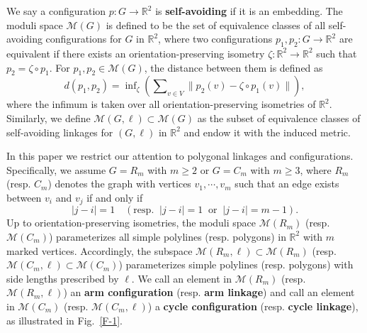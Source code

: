 \documentclass[11pt,letterpaper]{amsart}
\theoremstyle{plain}
\theoremstyle{definition}
\theoremstyle{remark}
\numberwithin{equation}{section}
\begin{document}
We say a configuration $p: G\to \mathbb R^{2}$ is \textbf{self-avoiding} if it is an embedding. The moduli space $\mathcal M(G)$ is defined to be the set of equivalence classes of all self-avoiding configurations for $G$ in $\mathbb R^2$, where two configurations $p_1,p_2: G\to \mathbb R^{2}$ are equivalent if there exists an orientation-preserving isometry
$\zeta:\mathbb R^{2}\to \mathbb R^{2}$ such that $p_2=\zeta\circ p_1$.  For $p_1,p_2\in\mathcal M(G)$, the distance between them is defined as
\[
d(p_1,p_2)=\inf\nolimits_{\zeta}\left(\sum\nolimits_{v\in V}\|p_2(v)-\zeta\circ p_1(v)\|\right),
\]
where the  infimum is taken over all orientation-preserving isometries of $\mathbb R^2$. Similarly, we define $\mathcal M(G,\ell)\subset \mathcal M(G)$ as the subset of equivalence classes of self-avoiding linkages for $(G,\ell)$ in $\mathbb R^2$ and endow it with the induced metric.

In this paper we restrict our attention to polygonal linkages and configurations. Specifically, we assume $G=R_m$ with $m\geq2$ or $G=C_m$ with $m\geq3$, where $R_m$ (resp. $C_m$) denotes the graph with vertices $v_1,\cdots, v_m$ such that an edge exists between $v_i$ and $v_j$ if and only if
\[
|j-i|=1\quad \left(\text{resp}.\;\;|j-i|=1\;\;\text{or}\;\;|j-i|=m-1\right).
\]
Up to orientation-preserving isometries, the moduli space $\mathcal M(R_m)$
(resp. $\mathcal M(C_m)$) parameterizes all simple polylines (resp. polygons) in
$\mathbb R^2$ with $m$ marked vertices. Accordingly, the subspace
$\mathcal M(R_m,\ell)\subset \mathcal M(R_m)$
(resp. $\mathcal M(C_m,\ell)\subset \mathcal M(C_m)$) parameterizes simple polylines (resp. polygons) with side lengths prescribed by $\ell$. We call an element in $\mathcal M(R_m)$ (resp. $\mathcal M(R_m,\ell)$) an \textbf{arm configuration} (resp. \textbf{arm linkage}) and call an element in $\mathcal M(C_m)$ (resp. $\mathcal M(C_m,\ell)$) a \textbf{cycle configuration} (resp. \textbf{cycle linkage}), as illustrated in Fig.~\ref{F-1}.
\end{document}
